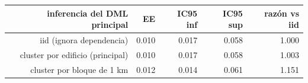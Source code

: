 \begin{tabular}{rrrrr}
\toprule
inferencia del DML principal & EE & IC95 inf & IC95 sup & razón vs iid \\
\midrule
iid (ignora dependencia) & 0.010 & 0.017 & 0.058 & 1.000 \\
cluster por edificio (principal) & 0.010 & 0.017 & 0.058 & 1.003 \\
cluster por bloque de 1 km & 0.012 & 0.014 & 0.061 & 1.151 \\
\bottomrule
\end{tabular}